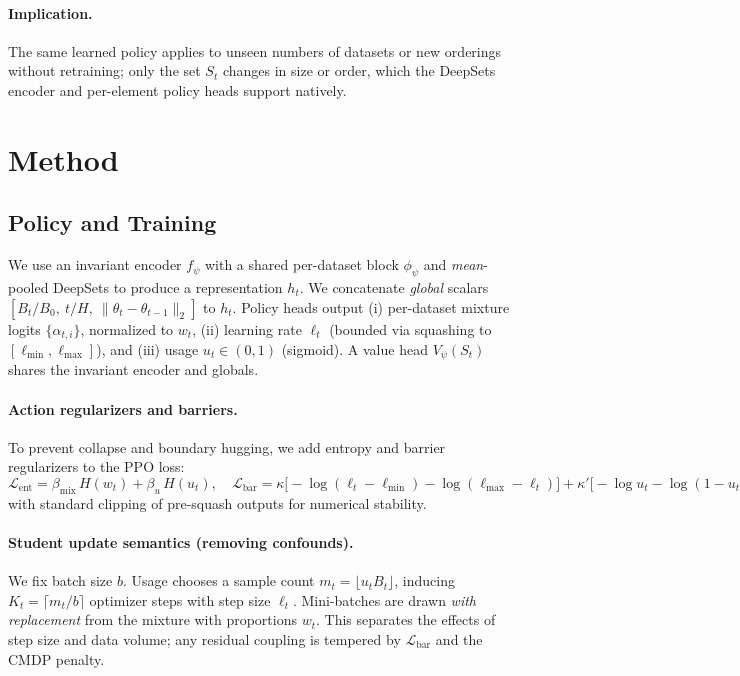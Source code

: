 \documentclass[11pt]{article}
\newcommand{\1}{\mathbf{1}}
\begin{document}
\paragraph{Implication.}
The same learned policy applies to unseen numbers of datasets or new orderings without retraining; only the set $S_t$ changes in size or order, which the DeepSets encoder and per-element policy heads support natively.

\section{Method}
\subsection{Policy and Training}
We use an invariant encoder $f_\psi$ with a shared per-dataset block $\phi_\psi$ and \emph{mean}-pooled DeepSets to produce a representation $h_t$.
We concatenate \emph{global} scalars $[B_t/B_0,~t/H,~\|\theta_t-\theta_{t-1}\|_2]$ to $h_t$.
Policy heads output (i) per-dataset mixture logits $\{\alpha_{t,i}\}$, normalized to $w_t$, (ii) learning rate $\ell_t$ (bounded via squashing to $[\ell_{\min},\ell_{\max}]$), and (iii) usage $u_t\in(0,1)$ (sigmoid).
A value head $V_\psi(S_t)$ shares the invariant encoder and globals.

\paragraph{Action regularizers and barriers.}
To prevent collapse and boundary hugging, we add entropy and barrier regularizers to the PPO loss:
\(
\mathcal{L}_{\text{ent}}= \beta_{\text{mix}}\, H(w_t) + \beta_u\, H(u_t),\quad
\mathcal{L}_{\text{bar}}= \kappa\big[-\log(\ell_t-\ell_{\min})-\log(\ell_{\max}-\ell_t)\big] + \kappa'\big[-\log u_t - \log (1-u_t)\big],
\)
with standard clipping of pre-squash outputs for numerical stability.

\paragraph{Student update semantics (removing confounds).}
We fix batch size $b$.
Usage chooses a sample count $m_t=\lfloor u_t B_t\rfloor$, inducing $K_t=\lceil m_t/b\rceil$ optimizer steps with step size $\ell_t$.
Mini-batches are drawn \emph{with replacement} from the mixture with proportions $w_t$.
This separates the effects of step size and data volume; any residual coupling is tempered by $\mathcal{L}_{\text{bar}}$ and the CMDP penalty.
\end{document}
